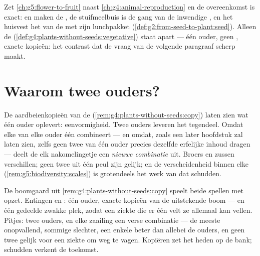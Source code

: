 \begin{remark}\label{rem:g8:sexual-reproduction:plants}
Zet \cref{ch:g5:flower-to-fruit} naast
\cref{ch:g4:animal-reproduction} en de overeenkomst is exact: 
en  maken de , de stuifmeelbuis is de gang van de inwendige
, en het  huisvest het  van de  met zijn
lunchpakket (\cref{def:g2:from-seed-to-plant:seed}). Alleen de  (\cref{def:g4:plants-without-seeds:vegetative}) staat apart
--- één ouder, geen , exacte kopieën: het contrast dat de vraag van
de volgende paragraaf scherp maakt.
\end{remark}

\section{Waarom twee ouders?}

\begin{proposition}\label{prop:g8:sexual-reproduction:shuffle}
De aardbeienkopieën van de 
(\cref{rem:g4:plants-without-seeds:copy}) laten zien wat één ouder
oplevert: eenvormigheid. Twee ouders leveren het tegendeel. Omdat elke
 van elke ouder één  combineert --- en omdat, zoals een later
hoofdstuk zal laten zien, zelfs geen twee  van één ouder precies
dezelfde erfelijke inhoud dragen --- deelt de 
elk nakomelingetje een \emph{nieuwe combinatie} uit. Broers en zussen
verschillen; geen twee  uit één peul zijn gelijk; en de
verscheidenheid binnen elke 
(\cref{rem:g5:biodiversity:scales}) is grotendeels het werk van dat
schudden.
\end{proposition}
\admitted

\begin{example}\label{ex:g8:sexual-reproduction:bets}
De boomgaard uit \cref{rem:g4:plants-without-seeds:copy} speelt beide
spellen met opzet. Entingen en : één ouder, exacte kopieën van de
uitstekende boom --- en één gedeelde zwakke plek, zodat een ziekte die er
één velt ze allemaal kan vellen. Pitjes: twee ouders, en elke zaailing een
verse combinatie --- de meeste onopvallend, sommige slechter, een enkele
beter dan allebei de ouders, en geen twee gelijk voor een ziekte om weg te
vagen. Kopiëren zet het heden op de bank; schudden verkent de toekomst.
\end{example}

